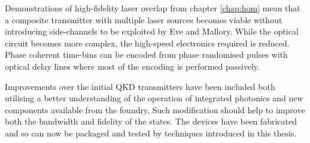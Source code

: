 Demonstrations of high-fidelity laser overlap from chapter \ref{chap:hom} mean that a composite transmitter with multiple laser sources becomes viable without introducing side-channels to be exploited by Eve and Mallory. While the optical circuit becomes more complex, the high-speed electronics required is reduced. Phase coherent time-bins can be encoded from phase randomised pulses with optical delay lines where most of the encoding is performed passively. 

Improvements over the initial \ac{QKD} transmitters have been included both utilising a better understanding of the operation of integrated photonics and new components available from the foundry. Such modification should help to improve both the bandwidth and fidelity of the states. The devices have been fabricated and so can now be packaged and tested by techniques introduced in this thesis.

